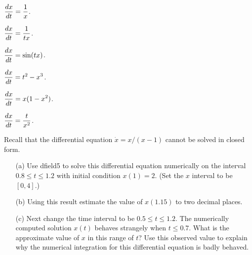 \begin{exercise} \label{c14.1.11a}
$\displaystyle\frac{dx}{dt} = \frac{1}{x}$.
\end{exercise}
\begin{exercise} \label{c14.1.11b}
$\displaystyle\frac{dx}{dt} = \frac{1}{tx}$.
\end{exercise}
\begin{exercise} \label{c14.1.11c}
$\displaystyle\frac{dx}{dt} = \sin(tx)$.
\end{exercise}
\begin{exercise} \label{c14.1.11d}
$\displaystyle\frac{dx}{dt} = t^2 - x^3$.
\end{exercise}
\begin{exercise} \label{c14.1.11e}
$\displaystyle\frac{dx}{dt} = x(1-x^2)$.
\end{exercise}
\begin{exercise} \label{c14.1.11f}
$\displaystyle\frac{dx}{dt} = \frac{t}{x^2}$.
\end{exercise}

\begin{exercise} \label{c14.1.17}
Recall that the differential equation  $\dot{x}=x/(x-1)$ cannot be 
solved in closed form.  
\begin{itemize}
\item[(a)]	Use {\sf dfield5} 
to solve this differential 
equation numerically on the interval $0.8\leq t\leq 1.2$ with initial 
condition $x(1)=2$.  (Set the $x$ interval to be $[0,4]$.)  
\item[(b)]	Using this result estimate the value of $x(1.15)$ to two 
decimal places.
\item[(c)]	Next change the time interval to be $0.5\leq t\leq 1.2$.
The numerically computed solution $x(t)$ behaves strangely when $t\leq 0.7$. 
What is the approximate value of $x$ in this range of $t$?  Use this 
observed value to explain why the numerical integration for this differential 
equation is badly behaved.
\end{itemize}
\end{exercise}

